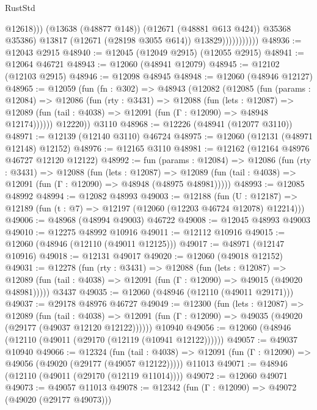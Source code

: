 \begin{lexlean}{RustStd}
\begin{coremodule}
                                  @12618)))
                            (@13638 (@48877 @148))
                            (@12671 (@48881 @613 @424))
                            @35368
                            @35386)
                          @13817
                          (@12671 (@28198 @3055 @614))
                          @13829)))))))))))
@48936 := @12043 @2915
@48940 := @12045 (@12049 @2915) (@12055 @2915)
@48941 := @12064 @46721
@48943 := @12060 (@48941 @12079)
@48945 := @12102 (@12103 @2915)
@48946 := @12098 @48945
@48948 := @12060 (@48946 @12127)
@48965 := @12059
    (fun (fn : @302) =>
    @48943
      (@12082
        (@12085
          (fun (params : @12084) =>
          @12086
            (fun (rty : @3431) =>
            @12088
              (fun (lets : @12087) =>
              @12089 (fun (tail : @4038) => @12091 (fun (Γ : @12090) => @48948 @12174))))))
        @12220))
    @3110
@48968 := @12226 (@48941 (@12077 @3110))
@48971 := @12139 (@12140 @3110) @46724
@48975 := @12060 (@12131 (@48971 @12148) @12152)
@48976 := @12165 @3110
@48981 := @12162 (@12164 @48976 @46727 @12120 @12122)
@48992 := fun (params : @12084) =>
  @12086
    (fun (rty : @3431) =>
    @12088
      (fun (lets : @12087) =>
      @12089 (fun (tail : @4038) => @12091 (fun (Γ : @12090) => @48948 (@48975 @48981)))))
@48993 := @12085 @48992
@48994 := @12082 @48993
@49003 := @12188
    (fun (U : @12187) => @12189 (fun (t : @7) => @12197 (@12060 (@12203 @46724 @12078) @12214)))
@49006 := @48968 (@48994 @49003) @46722
@49008 := @12045 @48993 @49003
@49010 := @12275 @48992 @10916
@49011 := @12112 @10916
@49015 := @12060 (@48946 (@12110 (@49011 @12125)))
@49017 := @48971 (@12147 @10916)
@49018 := @12131 @49017
@49020 := @12060 (@49018 @12152)
@49031 := @12278
    (fun (rty : @3431) =>
    @12088
      (fun (lets : @12087) =>
      @12089 (fun (tail : @4038) => @12091 (fun (Γ : @12090) => @49015 (@49020 @48981)))))
    @3437
@49035 := @12060 (@48946 (@12110 (@49011 @29171)))
@49037 := @29178 @48976 @46727
@49049 := @12300
    (fun (lets : @12087) =>
    @12089
      (fun (tail : @4038) =>
      @12091 (fun (Γ : @12090) => @49035 (@49020 (@29177 (@49037 @12120 @12122))))))
    @10940
@49056 := @12060 (@48946 (@12110 (@49011 (@29170 (@12119 (@10941 @12122))))))
@49057 := @49037 @10940
@49066 := @12324
    (fun (tail : @4038) => @12091 (fun (Γ : @12090) => @49056 (@49020 (@29177 (@49057 @12122)))))
    @11013
@49071 := @48946 (@12110 (@49011 (@29170 (@12119 @11014))))
@49072 := @12060 @49071
@49073 := @49057 @11013
@49078 := @12342 (fun (Γ : @12090) => @49072 (@49020 (@29177 @49073)))

\end{coremodule}
\end{lexlean}
